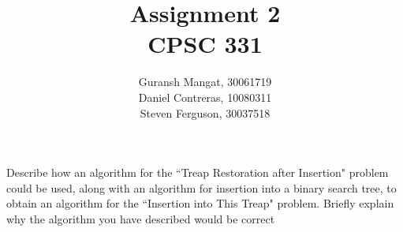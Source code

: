 \documentclass[12pt]{article}
\newenvironment{problem}[2][Problem]{\begin{trivlist}
\item[\hskip \labelsep {\bfseries #1}\hskip \labelsep {\bfseries #2.}]}{\end{trivlist}}
\begin{document}

\title{Assignment 2 \\ CPSC 331} %
\author{Guransh Mangat, 30061719 \\ Daniel Contreras, 10080311 \\ Steven Ferguson, 30037518\\}
\date{}



\maketitle{}

\newpage

\begin{problem}{1}
    Describe how an algorithm for the ``Treap Restoration after Insertion" problem could be used, along with an algorithm for insertion into a binary search tree, to obtain an algorithm for the ``Insertion into This Treap" problem. Briefly explain why the algorithm you have described would be correct
\end{problem}
\end{document}
